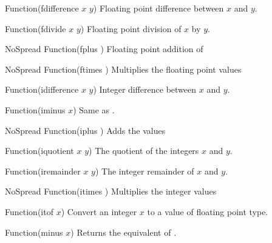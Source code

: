 \begin{defun}{Function}{(fdifference $x$ $y$)}
  Floating point difference between $x$ and $y$.
\end{defun}

\begin{defun}{Function}{(fdivide $x$ $y$)}
  Floating point division of $x$ by $y$.
\end{defun}

\begin{defun}{NoSpread Function}{(fplus \xargs)}
  Floating point addition of \largs
\end{defun}

\begin{defun}{NoSpread Function}{(ftimes \xargs)}
  Multiplies the floating point values \largs
\end{defun}

\begin{defun}{Function}{(idifference $x$ $y$)}
  Integer difference between $x$ and $y$.
\end{defun}

\begin{defun}{Function}{(iminus $x$)}
  Same as .
\end{defun}

\begin{defun}{NoSpread Function}{(iplus \xargs)}
  Adds the values \largs
\end{defun}

\begin{defun}{Function}{(iquotient $x$ $y$)}
  The quotient of the integers $x$ and $y$.
\end{defun}

\begin{defun}{Function}{(iremainder $x$ $y$)}
  The integer remainder of $x$ and $y$.
\end{defun}

\begin{defun}{NoSpread Function}{(itimes \xargs)}
  Multiplies the integer values \largs
\end{defun}

\begin{defun}{Function}{(itof $x$)}
  Convert an integer $x$ to a value of floating point type.
\end{defun}

\begin{defun}{Function}{(minus $x$)}
  Returns the equivalent of .
\end{defun}

